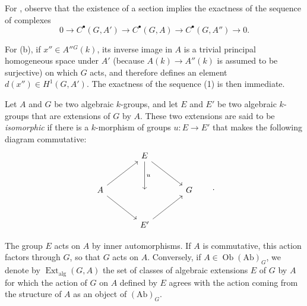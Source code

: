 For , observe that the existence of a section implies the
exactness of the sequence of complexes
\[
  0\longrightarrow C^\bullet(G,A')\longrightarrow C^\bullet(G,A)
    \longrightarrow C^\bullet(G,A'')\longrightarrow0.
\]


For (b), if \(x''\in A''{}^G(k)\), its inverse image in \(A\)
is a trivial principal homogeneous space under \(A'\) (because
\(A(k)\to A''(k)\) is assumed to be surjective) on which \(G\)
acts, and therefore defines an element
\(d(x'')\in H^1(G,A')\).  The exactness of the sequence (1) is
then immediate.


Let \(A\) and \(G\) be two algebraic \(k\)-groups, and let \(E\)
and \(E'\) be two algebraic \(k\)-groups that are extensions of
\(G\) by \(A\).  These two extensions are said to be
\emph{isomorphic} if there is a \(k\)-morphism of groups
\(u:E\to E'\) that makes the following diagram commutative:
\[
\begin{tikzcd}[column sep=large,row sep=large]
  {} & E \arrow[dr] \arrow[d,"u"] & {} \\
  A \arrow[ur] \arrow[dr] & {} & G \\
  {} & E' \arrow[ur] & {}
\end{tikzcd}
\qquad .
\]

The group \(E\) acts on \(A\) by inner automorphisms.  If \(A\)
is commutative, this action factors through \(G\), so that \(G\)
acts on \(A\).  Conversely, if
\(A\in\operatorname{Ob}(\mathrm{Ab})_G\), we denote by
\(\operatorname{Ext}_{\mathrm{alg}}(G,A)\) the set of classes of
algebraic extensions \(E\) of \(G\) by \(A\) for which the
action of \(G\) on \(A\) defined by \(E\) agrees with the action
coming from the structure of \(A\) as an object of
\((\mathrm{Ab})_G\).

